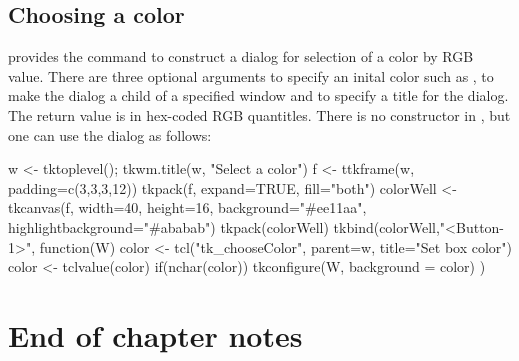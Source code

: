 \subsection{Choosing a color}
\Tk\/ provides the command  to construct a dialog for selection of a color by RGB value. There are three optional arguments  to specify an inital color such as ,  to make the dialog a child of a specified window and  to specify a title for the dialog. The return value is in hex-coded RGB quantitles. 
There is no constructor in , but one can use the dialog as follows:
\begin{Schunk}
\begin{Sinput}
 w <- tktoplevel(); tkwm.title(w, "Select a color")
 f <- ttkframe(w, padding=c(3,3,3,12))
 tkpack(f, expand=TRUE, fill="both")
 colorWell <- tkcanvas(f, width=40, height=16, 
                       background="#ee11aa",
                       highlightbackground="#ababab") 
 tkpack(colorWell)
 tkbind(colorWell,"<Button-1>", function(W) {
   color <- tcl("tk_chooseColor", parent=w, title="Set box color")
   color <- tclvalue(color)
   if(nchar(color))
     tkconfigure(W, background = color)
 })
\end{Sinput}
\end{Schunk}

\section{End of chapter notes}
\label{sec:tcltk:eoc}



